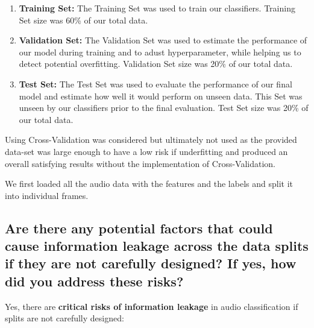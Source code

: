 \begin{enumerate}
	\item {\bf Training Set: } The Training Set was used to train our classifiers. Training Set size was 60\% of our total data.
	
	\item {\bf Validation Set: } The Validation Set was used to estimate the performance of our model during training and to adust hyperparameter, while helping us to detect potential overfitting. Validation Set size was 20\% of our total data.

	\item {\bf Test Set: } The Test Set was used to evaluate the performance of our final model and estimate how well it would perform on unseen data. This Set was unseen by our classifiers prior to the final evaluation. Test Set size was 20\% of our total data.


    
\end{enumerate}

Using Cross-Validation was considered but ultimately not used as the provided data-set was large enough to have a low risk if underfitting and produced an overall satisfying results without the implementation of Cross-Validation.


We first loaded all the audio data with the features and the labels and split it into individual frames. 


\newpage

\subsection{Are there any potential factors that could cause information leakage across the data splits if they are not carefully designed? If yes, how did you address these risks?}

Yes, there are {\bf critical risks of information leakage} in audio classification if splits are not carefully designed:


\label{sec:Data Split:b}

